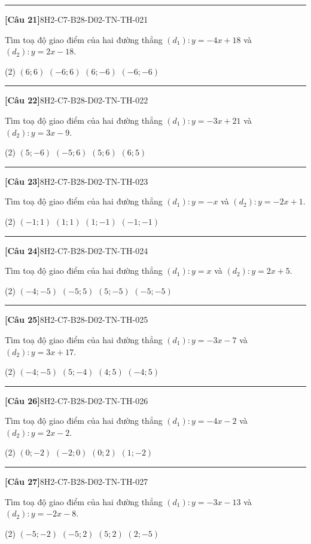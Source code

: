 \documentclass[12pt,a4paper]{article}
\newif\ifloigiai
\newenvironment{cauhoi}[2]{%
  \par\medskip\noindent\rule{\textwidth}{0.4pt}\par\nopagebreak
  \noindent\textbf{[#1]}\hfill{\scriptsize\ttfamily #2}\par\nopagebreak\smallskip}{\par}
\newcommand{\dapan}[1]{\ifloigiai\par\smallskip\noindent\textit{Đáp án:} \textbf{#1}\par\fi}
\begin{document}
\begin{cauhoi}{Câu 21}{8H2-C7-B28-D02-TN-TH-021}
Tìm toạ độ giao điểm của hai đường thẳng $(d_1): y=-4x+18$ và $(d_2): y=2x-18$.
\begin{tasks}(2)
\task $(6;6)$
\task $(-6;6)$
\task $(6;-6)$
\task $(-6;-6)$
\end{tasks}
\dapan{C}
\end{cauhoi}
\begin{cauhoi}{Câu 22}{8H2-C7-B28-D02-TN-TH-022}
Tìm toạ độ giao điểm của hai đường thẳng $(d_1): y=-3x+21$ và $(d_2): y=3x-9$.
\begin{tasks}(2)
\task $(5;-6)$
\task $(-5;6)$
\task $(5;6)$
\task $(6;5)$
\end{tasks}
\dapan{C}
\end{cauhoi}
\begin{cauhoi}{Câu 23}{8H2-C7-B28-D02-TN-TH-023}
Tìm toạ độ giao điểm của hai đường thẳng $(d_1): y=-x$ và $(d_2): y=-2x+1$.
\begin{tasks}(2)
\task $(-1;1)$
\task $(1;1)$
\task $(1;-1)$
\task $(-1;-1)$
\end{tasks}
\dapan{C}
\end{cauhoi}
\begin{cauhoi}{Câu 24}{8H2-C7-B28-D02-TN-TH-024}
Tìm toạ độ giao điểm của hai đường thẳng $(d_1): y=x$ và $(d_2): y=2x+5$.
\begin{tasks}(2)
\task $(-4;-5)$
\task $(-5;5)$
\task $(5;-5)$
\task $(-5;-5)$
\end{tasks}
\dapan{D}
\end{cauhoi}
\begin{cauhoi}{Câu 25}{8H2-C7-B28-D02-TN-TH-025}
Tìm toạ độ giao điểm của hai đường thẳng $(d_1): y=-3x-7$ và $(d_2): y=3x+17$.
\begin{tasks}(2)
\task $(-4;-5)$
\task $(5;-4)$
\task $(4;5)$
\task $(-4;5)$
\end{tasks}
\dapan{D}
\end{cauhoi}
\begin{cauhoi}{Câu 26}{8H2-C7-B28-D02-TN-TH-026}
Tìm toạ độ giao điểm của hai đường thẳng $(d_1): y=-4x-2$ và $(d_2): y=2x-2$.
\begin{tasks}(2)
\task $(0;-2)$
\task $(-2;0)$
\task $(0;2)$
\task $(1;-2)$
\end{tasks}
\dapan{A}
\end{cauhoi}
\begin{cauhoi}{Câu 27}{8H2-C7-B28-D02-TN-TH-027}
Tìm toạ độ giao điểm của hai đường thẳng $(d_1): y=-3x-13$ và $(d_2): y=-2x-8$.
\begin{tasks}(2)
\task $(-5;-2)$
\task $(-5;2)$
\task $(5;2)$
\task $(2;-5)$
\end{tasks}
\dapan{B}
\end{cauhoi}
\end{document}
